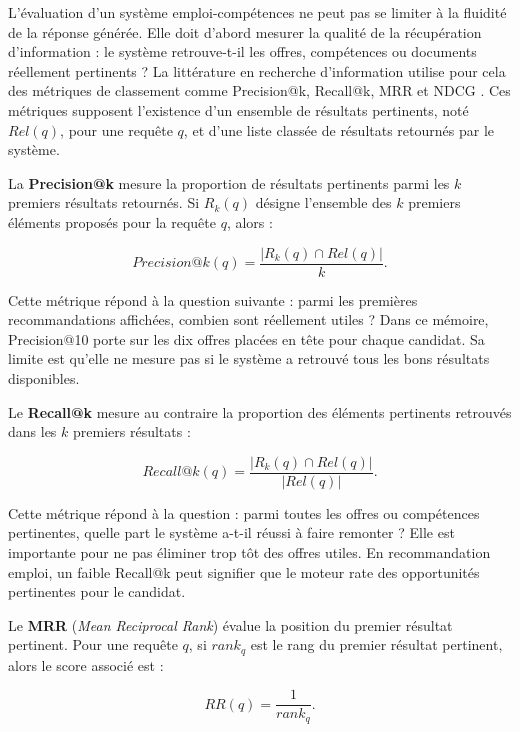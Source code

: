 L'évaluation d'un système emploi-compétences ne peut pas se limiter à la fluidité de la réponse générée. Elle doit d'abord mesurer la qualité de la récupération d'information : le système retrouve-t-il les offres, compétences ou documents réellement pertinents ? La littérature en recherche d'information utilise pour cela des métriques de classement comme Precision@k, Recall@k, MRR et NDCG \cite{thakur2021beir,muennighoff2022mteb}. Ces métriques supposent l'existence d'un ensemble de résultats pertinents, noté $Rel(q)$, pour une requête $q$, et d'une liste classée de résultats retournés par le système.

La \textbf{Precision@k} mesure la proportion de résultats pertinents parmi les $k$ premiers résultats retournés. Si $R_k(q)$ désigne l'ensemble des $k$ premiers éléments proposés pour la requête $q$, alors :

\begin{equation}
Precision@k(q)=\frac{|R_k(q)\cap Rel(q)|}{k}.
\end{equation}

Cette métrique répond à la question suivante : parmi les premières recommandations affichées, combien sont réellement utiles ? Dans ce mémoire, Precision@10 porte sur les dix offres placées en tête pour chaque candidat. Sa limite est qu'elle ne mesure pas si le système a retrouvé tous les bons résultats disponibles.

Le \textbf{Recall@k} mesure au contraire la proportion des éléments pertinents retrouvés dans les $k$ premiers résultats :

\begin{equation}
Recall@k(q)=\frac{|R_k(q)\cap Rel(q)|}{|Rel(q)|}.
\end{equation}

Cette métrique répond à la question : parmi toutes les offres ou compétences pertinentes, quelle part le système a-t-il réussi à faire remonter ? Elle est importante pour ne pas éliminer trop tôt des offres utiles. En recommandation emploi, un faible Recall@k peut signifier que le moteur rate des opportunités pertinentes pour le candidat.

Le \textbf{MRR} (\emph{Mean Reciprocal Rank}) évalue la position du premier résultat pertinent. Pour une requête $q$, si $rank_q$ est le rang du premier résultat pertinent, alors le score associé est :

\begin{equation}
RR(q)=\frac{1}{rank_q}.
\end{equation}

